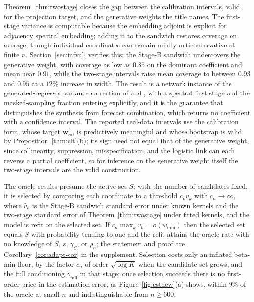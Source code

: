 \documentclass[12pt]{article}
\makeatletter
\def\subsection{\@startsection{subsection}{2}{\z@}{-0.13in}{0.03in}{\normalsize\bf\raggedright}}
\newcommand{\1}{\mathbf{1}}
\newcommand{\bw}{\mathbf{w}}
\makeatother
\begin{document}
\noindent Theorem~\ref{thm:twostage} closes the gap between the calibration intervals, valid for the
projection target, and the generative weights the title names. The first-stage variance is computable because
the embedding adjoint is explicit for adjacency spectral embedding; adding it to the sandwich restores
coverage on average, though individual coordinates can remain mildly anticonservative at finite $n$.
Section~\ref{sec:infval} verifies this: the Stage-B sandwich undercovers the generative weight, with coverage
as low as $0.85$ on the dominant coefficient and mean near $0.91$, while the two-stage intervals raise mean
coverage to between $0.93$ and $0.95$ at a $12\%$ increase in width. The result is a network instance of the
generated-regressor variance correction of \citet{pagan1984econometric} and \citet{murphy2002estimation}, with a spectral
first stage and the masked-sampling fraction entering explicitly, and it is the guarantee that distinguishes
the synthesis from forecast combination, which returns no coefficient with a confidence interval. The reported
real-data intervals use the calibration form, whose target $\bw^\dagger_{\mathrm{cal}}$ is predictively
meaningful and whose bootstrap is valid by Proposition~\ref{thm:clt}(b); its sign need not equal that of the
generative weight, since collinearity, suppression, misspecification, and the logistic link can each reverse a
partial coefficient, so for inference on the generative weight itself the two-stage intervals are the valid
construction.


\subsection{Adaptive selection}
\label{sec:adapt}
The oracle results presume the active set $S$; with the number of candidates fixed, it is selected by comparing each coordinate to a threshold $c_n\widehat v_k$ with $c_n\to\infty$, where $\widehat v_k$ is the Stage-B sandwich standard error under known kernels and the two-stage standard error of Theorem~\ref{thm:twostage} under fitted kernels, and the model is refit on the selected set. If $c_n\max_k v_k=o(w_{\min})$ then the selected set equals $S$ with probability tending to one and the refit attains the oracle rate with no knowledge of $S$, $s$, $\gamma_S$, or $\rho_n$; the statement and proof are Corollary~\ref{cor:adapt-cor} in the supplement. Selection costs only an inflated beta-min floor, by the factor $c_n$ of order $\sqrt{\log K}$ when the candidate set grows, and the full conditioning $\gamma_{\mathrm{full}}$ in that stage; once selection succeeds there is no first-order price in the estimation error, as Figure~\ref{fig:estnew}(a) shows, within $9\%$ of the oracle at small $n$ and indistinguishable from $n\ge600$.
\end{document}
